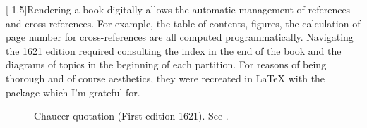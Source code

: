 [-1.5\baselineskip]Rendering a book digitally allows the automatic management of references and cross-references. For example, the table of contents, figures, the calculation of page number for cross-references \etc{} are all computed programmatically. Navigating the 1621 edition required consulting the index in the end of the book and the diagrams of topics in the beginning of each partition. For reasons of being thorough and of course aesthetics, they were recreated in \LaTeX{} with the \href{https://www.ctan.org/pkg/schemata}{} package which I'm grateful for.

\clearpage{}
\begin{figure}[H]%
  \centering
    \caption*{\scriptsize{}Chaucer quotation (First edition 1621). See .}
  \label{fig:chaucer-first-edition}%
\end{figure}

